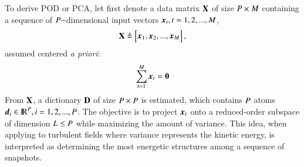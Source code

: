 To derive POD or PCA, let first denote a data matrix $ \mathbf{X} $ of size $ P \times M $ containing a sequence of $ P- $dimensional input vectors $ \operatorname{\boldsymbol{x}}_t, t=1,2,...,M $,
\begin{equation}
\mathbf{X} \triangleq \begin{bmatrix} \operatorname{\boldsymbol{x}}_1, \operatorname{\boldsymbol{x}}_2, ..., \operatorname{\boldsymbol{x}}_M \end{bmatrix},
\end{equation} 
assumed centered \textit{a priori}:
\begin{equation}
\sum\limits_{t=1}^{M}\operatorname{\boldsymbol{x}}_t = \operatorname{\boldsymbol{0}}
\end{equation}
From $ \mathbf{X} $, a dictionary $ \mathbf{D} $ of size $ P \times P $ is estimated, which contains $ P $ atoms $ \boldsymbol{d}_i \in {\rm I\!R} ^P, i=1,2,...,P  $. The objective is to project $ \operatorname{\boldsymbol{x}}_t $ onto a reduced-order subspace of dimension $ L \leq P $ while maximizing the amount of variance. This idea, when applying to turbulent fields where variance represents the kinetic energy, is interpreted as determining the most energetic structures among a sequence of snapshots. 


